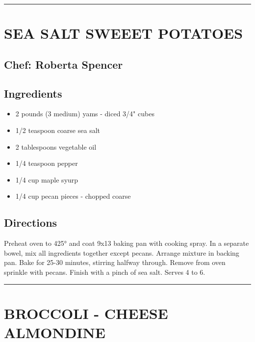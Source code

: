 \documentclass[
]{book}
\providecommand{\tightlist}{%
  \setlength{\itemsep}{0pt}\setlength{\parskip}{0pt}}
\begin{document}
\begin{center}\rule{0.5\linewidth}{0.5pt}\end{center}

\hypertarget{sea-salt-sweeet-potatoes}{%
\section*{SEA SALT SWEEET POTATOES}\label{sea-salt-sweeet-potatoes}}


\hypertarget{chef-roberta-spencer-5}{%
\subsection*{Chef: Roberta Spencer}\label{chef-roberta-spencer-5}}


\hypertarget{ingredients-26}{%
\subsection*{Ingredients}\label{ingredients-26}}


\begin{itemize}
\tightlist
\item
  2 pounds (3 medium) yams - diced 3/4" cubes
\item
  1/2 teaspoon coarse sea salt
\item
  2 tablespoons vegetable oil
\item
  1/4 teaspoon pepper
\item
  1/4 cup maple syurp
\item
  1/4 cup pecan pieces - chopped coarse
\end{itemize}

\hypertarget{directions-26}{%
\subsection*{Directions}\label{directions-26}}


Preheat oven to 425° and coat 9x13 baking pan with cooking spray. In a separate bowel, mix all ingredients together except pecans. Arrange mixture in backing pan. Bake for 25-30 minutes, stirring halfway through. Remove from oven sprinkle with pecans. Finish with a pinch of sea salt. Serves 4 to 6.

\begin{center}\rule{0.5\linewidth}{0.5pt}\end{center}

\hypertarget{broccoli---cheese-almondine}{%
\section*{BROCCOLI - CHEESE ALMONDINE}\label{broccoli---cheese-almondine}}
\end{document}

